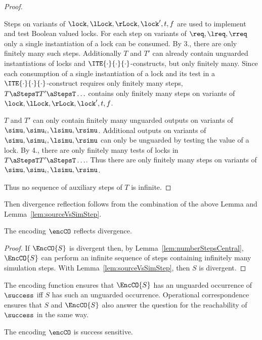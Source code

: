 \documentclass[]{eptcs}
\begin{document}
\begin{proof}
\begin{compactenum}
		\item Steps on variants of $ \lock, \lLock, \rLock, \lock', t, f $ are used to implement and test Boolean valued locks. For each step on variants of $ \req, \lreq, \rreq $ only a single instantiation of a lock can be consumed. By 3., there are only finitely many such steps. Additionally $ T $ and $ T' $ can already contain unguarded instantiations of locks and $ \ITE{\cdot}{\cdot}{\cdot} $-constructs, but only finitely many. Since each consumption of a single instantiation of a lock and its test in a $ \ITE{\cdot}{\cdot}{\cdot} $-construct requires only finitely many steps, $ T \aStepsT T' \aStepsT \ldots $ contains only finitely many steps on variants of $ \lock, \lLock, \rLock, \lock', t, f $.
		\item $ T $ and $ T' $ can only contain finitely many unguarded outputs on variants of $ \simu, \simu_i, \lsimu, \rsimu $. Additional outputs on variants of $ \simu, \simu_i, \lsimu, \rsimu $ can only be unguarded by testing the value of a lock. By 4., there are only finitely many tests of locks in $ T \aStepsT T' \aStepsT \ldots $. Thus there are only finitely many steps on variants of $ \simu, \simu_i, \lsimu, \rsimu $.
	\end{compactenum}
	Thus no sequence of auxiliary steps of $ T $ is infinite.
\end{proof}

Then divergence reflection follows from the combination of the above Lemma and Lemma~\ref{lem:sourceVsSimStep}.

\begin{theorem}
	The encoding $ \encCO $ reflects divergence.
	\label{thm:divergenceReflectionCentral}
\end{theorem}

\begin{proof}
	If $ \EncCO{S} $ is divergent then, by Lemma~\ref{lem:numberStepsCentral}, $ \EncCO{S} $ can perform an infinite sequence of steps containing infinitely many simulation steps. With Lemma~\ref{lem:sourceVsSimStep}, then $ S $ is divergent.
\end{proof}

The encoding function ensures that $ \EncCO{S} $ has an unguarded occurrence of $ \success $ iff $ S $ has such an unguarded occurrence. Operational correspondence ensures that $ S $ and $ \EncCO{S} $ also answer the question for the reachability of $ \success $ in the same way.

\begin{theorem}
	The encoding $ \encCO $ is success sensitive.
	\label{thm:successSensitivenessCentral}
\end{theorem}
\end{document}
